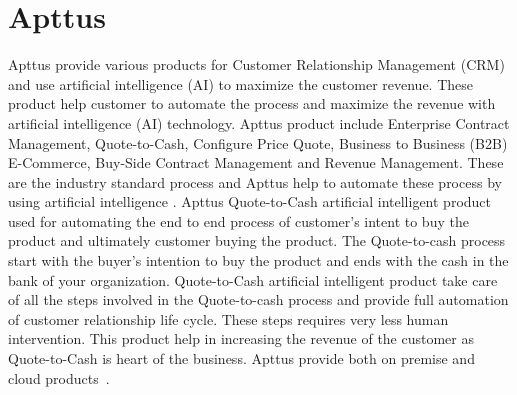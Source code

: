 \section{Apttus}

Apttus provide various products for Customer Relationship Management
(CRM) and use artificial intelligence (AI) to maximize the customer
revenue. These product help customer to automate the process and
maximize the revenue with artificial intelligence (AI) technology. Apttus
product include Enterprise Contract Management, Quote-to-Cash,
Configure Price Quote, Business to Business (B2B) E-Commerce, Buy-Side
Contract Management and Revenue Management. These are the industry standard process 
and Apttus help to automate these process by using artificial intelligence . Apttus Quote-to-Cash
artificial intelligent product used for automating the end to end
process of customer's intent to buy the product and ultimately
customer buying the product. The Quote-to-cash process start with the buyer's intention to buy the product and ends with the cash in the bank of your organization. Quote-to-Cash artificial intelligent
product take care of all the steps involved in the Quote-to-cash
process and provide full automation of customer relationship life
cycle. These steps requires very less human intervention. This product
help in increasing the revenue of the customer as Quote-to-Cash is
heart of the business. Apttus provide both on premise and cloud
products~\cite{hid-sp18-511-apttus}.
 
